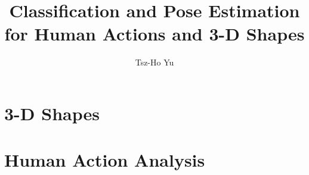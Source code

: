 \documentclass[a4paper, 12pt]{class/thyuthesis}
\title{Classification and Pose Estimation for Human Actions and 3-D Shapes}
\author{Tsz-Ho Yu}
\begin{document}

\setcounter{secnumdepth}{3}
\setcounter{tocdepth}{3}

\frontmatter
{}

%
%


\mainmatter



\part{3-D Shapes}

%
%
%

\part{Human Action Analysis}

%
%
%
%

% 

\backmatter
\appendix
%


\renewcommand{\bibname}{References} 
 
\end{document}
